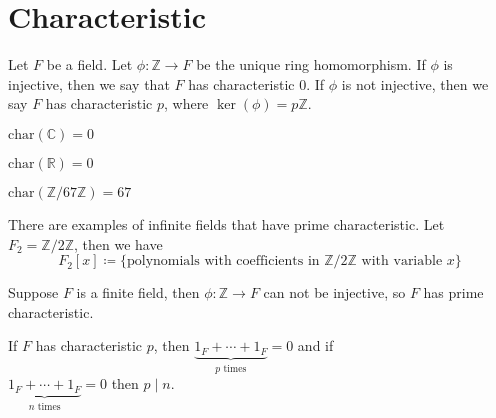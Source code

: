 \section{Characteristic}
\begin{definition}
	Let \(F\) be a field. Let \(\phi \colon \mathbb{Z} \to F\) be the unique ring homomorphism. If \(\phi \) is injective, then we say that \(F\) has characteristic \(0\). If \(\phi \) is not injective, then we say \(F\) has characteristic \(p\), where \(\ker(\phi ) = p\mathbb{Z} \).
\end{definition}

\begin{eg}
	\(\text{char}(\mathbb{C} ) = 0\)
\end{eg}
\begin{eg}
	\(\text{char}(\mathbb{R} ) = 0\)
\end{eg}
\begin{eg}
	\(\text{char}(\mathbb{Z} / 67\mathbb{Z}  ) = 67\)
\end{eg}
\begin{eg}
    There are examples of infinite fields that have prime characteristic. Let \(F_2 = \mathbb{Z} /2\mathbb{Z} \), then we have
    \[
        F_2[x] \coloneqq \{ \text{polynomials with coefficients in } \mathbb{Z} /2\mathbb{Z} \text{ with variable } x \} 
    \]
\end{eg}
\begin{lemma}
	Suppose \(F\) is a finite field, then \(\phi \colon \mathbb{Z} \to F\) can not be injective, so \(F\) has prime characteristic.
\end{lemma}
\begin{lemma}
	If \(F\) has characteristic \(p\), then \(\underbrace{1_F + \cdots + 1_F}_{p \text{ times} } = 0\) and if \\ \(\underbrace{1_F + \cdots + 1_F}_{n \text{ times} } = 0\) then \(p\mid n\).
\end{lemma}

